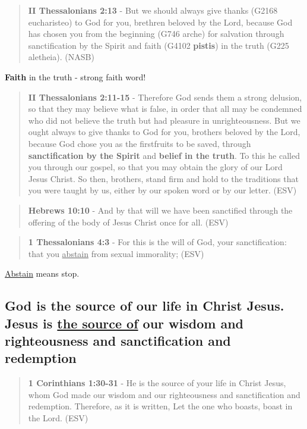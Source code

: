 \documentclass[11pt]{article}
\begin{document}
\begin{quote}
\textbf{II Thessalonians 2:13} - But we should always give thanks (G2168 eucharisteo) to God for you, brethren beloved by the Lord, because God has chosen you from the beginning (G746 arche) for salvation through sanctification by the Spirit and faith (G4102 \textbf{pistis}) in the truth (G225 aletheia). (NASB)
\end{quote}

\textbf{Faith} in the truth - strong faith word!

\begin{quote}
\textbf{II Thessalonians 2:11-15} - Therefore God sends them a strong delusion, so that they may believe what is false, in order that all may be condemned who did not believe the truth but had pleasure in unrighteousness. But we ought always to give thanks to God for you, brothers beloved by the Lord, because God chose you as the firstfruits to be saved, through \textbf{sanctification by the Spirit} and \textbf{belief in the truth}. To this he called you through our gospel, so that you may obtain the glory of our Lord Jesus Christ. So then, brothers, stand firm and hold to the traditions that you were taught by us, either by our spoken word or by our letter.  (ESV)
\end{quote}

\begin{quote}
\textbf{Hebrews 10:10} - And by that will we have been sanctified through the offering of the body of Jesus Christ once for all. (ESV)
\end{quote}

\begin{quote}
\textbf{1 Thessalonians 4:3} -  For this is the will of God, your sanctification: that you \uline{abstain} from sexual immorality;  (ESV)
\end{quote}

\uline{Abstain} means stop.

\subsection{God is the source of our life in Christ Jesus. Jesus is \underline{the source of} our wisdom and righteousness and sanctification and redemption}
\label{sec:org52933f7}
\begin{quote}
\textbf{1 Corinthians 1:30-31} -  He is the source of your life in Christ Jesus, whom God made our wisdom and our righteousness and sanctification and redemption.  Therefore, as it is written, Let the one who boasts, boast in the Lord.  (ESV)
\end{quote}
\end{document}
